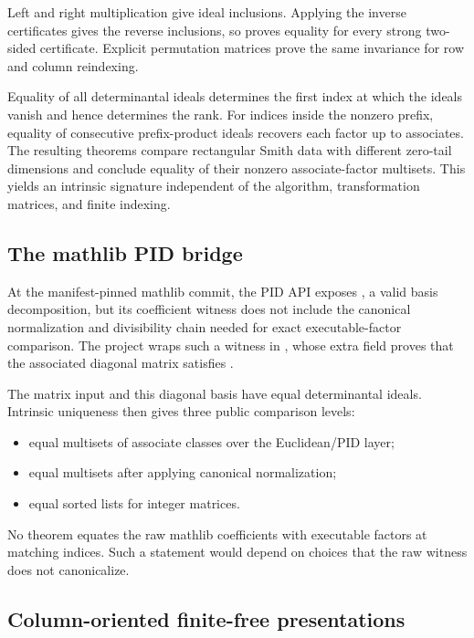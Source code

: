 Left and right multiplication give ideal inclusions. Applying the inverse
certificates gives the reverse inclusions, so
 proves equality for every
strong two-sided certificate. Explicit permutation matrices prove the same
invariance for row and column reindexing.

Equality of all determinantal ideals determines the first index at which the
ideals vanish and hence determines the rank. For indices inside the nonzero
prefix, equality of consecutive prefix-product ideals recovers each factor up
to associates. The resulting theorems compare rectangular Smith data with
different zero-tail dimensions and conclude equality of their nonzero
associate-factor multisets. This yields an intrinsic signature independent of
the algorithm, transformation matrices, and finite indexing.

\subsection{The mathlib PID bridge}

At the manifest-pinned mathlib commit, the PID API
\citep{mathlib4320pid} exposes
, a valid basis
decomposition, but its coefficient witness does not include the canonical
normalization and divisibility chain needed for exact executable-factor
comparison. The project wraps such a witness in
, whose extra field proves that the associated
diagonal matrix satisfies .

The matrix input and this diagonal basis have equal determinantal ideals.
Intrinsic uniqueness then gives three public comparison levels:

\begin{itemize}
  \item equal multisets of associate classes over the Euclidean/PID layer;
  \item equal multisets after applying canonical normalization;
  \item equal sorted  lists for integer matrices.
\end{itemize}

No theorem equates the raw mathlib coefficients with executable factors at
matching indices. Such a statement would depend on choices that the raw
witness does not canonicalize.

\subsection{Column-oriented finite-free presentations}

